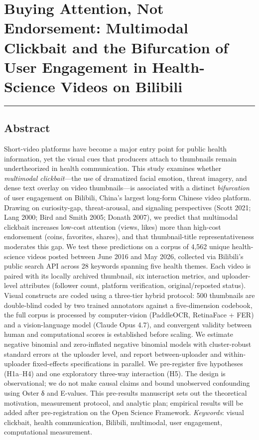 \documentclass[
  12pt,
]{article}
\author{}
\date{}
\begin{document}
\section{Buying Attention, Not Endorsement: Multimodal Clickbait and the
Bifurcation of User Engagement in Health-Science Videos on
Bilibili}\label{buying-attention-not-endorsement-multimodal-clickbait-and-the-bifurcation-of-user-engagement-in-health-science-videos-on-bilibili}

\begin{center}\rule{0.5\linewidth}{0.5pt}\end{center}

\subsection{Abstract}\label{abstract}

Short-video platforms have become a major entry point for public health
information, yet the visual cues that producers attach to thumbnails
remain undertheorized in health communication. This study examines
whether \emph{multimodal clickbait}---the use of dramatized facial
emotion, threat imagery, and dense text overlay on video thumbnails---is
associated with a distinct \emph{bifurcation} of user engagement on
Bilibili, China's largest long-form Chinese video platform. Drawing on
curiosity-gap, threat-arousal, and signaling perspectives (Scott 2021;
Lang 2000; Bird and Smith 2005; Donath 2007), we predict that multimodal
clickbait increases low-cost attention (views, likes) more than
high-cost endorsement (coins, favorites, shares), and that
thumbnail-title representativeness moderates this gap. We test these
predictions on a corpus of 4,562 unique health-science videos posted
between June 2016 and May 2026, collected via Bilibili's public search
API across 28 keywords spanning five health themes. Each video is paired
with its locally archived thumbnail, six interaction metrics, and
uploader-level attributes (follower count, platform verification,
original/reposted status). Visual constructs are coded using a
three-tier hybrid protocol: 500 thumbnails are double-blind coded by two
trained annotators against a five-dimension codebook, the full corpus is
processed by computer-vision (PaddleOCR, RetinaFace + FER) and a
vision-language model (Claude Opus 4.7), and convergent validity between
human and computational scores is established before scaling. We
estimate negative binomial and zero-inflated negative binomial models
with cluster-robust standard errors at the uploader level, and report
between-uploader and within-uploader fixed-effects specifications in
parallel. We pre-register five hypotheses (H1a--H4) and one exploratory
three-way interaction (H5). The design is observational; we do not make
causal claims and bound unobserved confounding using Oster δ and
E-values. This pre-results manuscript sets out the theoretical
motivation, measurement protocol, and analytic plan; empirical results
will be added after pre-registration on the Open Science Framework.
\emph{Keywords}: visual clickbait, health communication, Bilibili,
multimodal, user engagement, computational measurement.
\end{document}
